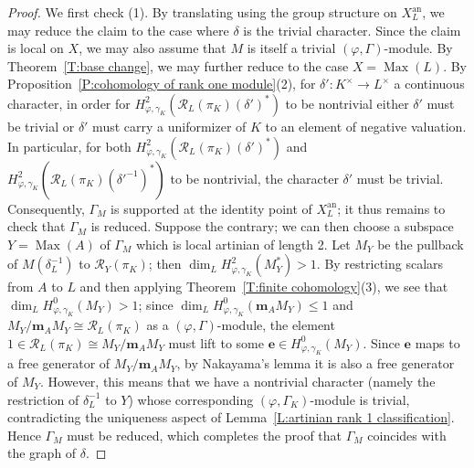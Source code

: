 \documentclass[12pt]{article}
\theoremstyle{definition}
\numberwithin{equation}{theorem}
\newcommand{\calR}{\mathcal{R}}
\newcommand{\bbe}{\mathbf{e}}
\newcommand{\bbm}{\mathbf{m}}
\newcommand{\an}{\mathrm{an}}
\DeclareMathOperator{\Max}{Max}
\begin{document}
\begin{proof}
We first check (1).
By translating using the group structure on $X^{\an}_L$, we may reduce the claim to the case where $\delta$ is the trivial character. Since the claim is local on $X$, we may also assume that $M$ is itself a trivial $(\varphi, \Gamma)$-module. By Theorem~\ref{T:base change}, we may further reduce to the case $X = \Max(L)$.
By Proposition~\ref{P:cohomology of rank one module}(2), for
$\delta': K^\times \to L^\times$ a continuous character, 
in order for
$H^2_{\varphi, \gamma_K}(\calR_L(\pi_K)(\delta')^*)$ to be nontrivial
either $\delta'$ must be trivial or $\delta'$ must carry a uniformizer of $K$ to an element of negative valuation. In particular, for both
$H^2_{\varphi, \gamma_K}(\calR_L(\pi_K)(\delta')^*)$ 
and
$H^2_{\varphi, \gamma_K}(\calR_L(\pi_K)(\left.\delta' \right.^{-1})^*)$ to be nontrivial,
the character $\delta'$ must be trivial.
Consequently, $\Gamma_M$ is supported at the identity point of $X^{\an}_L$; it thus remains to check that $\Gamma_M$ is reduced. Suppose the contrary; we can then choose a subspace $Y = \Max(A)$ of $\Gamma_M$ which is local artinian of length 2.
Let $M_Y$ be the pullback of $M(\delta_L^{-1})$ to $\calR_Y(\pi_K)$;
then $\dim_L H^2_{\varphi,\gamma_K}(M_Y^*) > 1$. By restricting scalars from $A$ to $L$ and then applying Theorem~\ref{T:finite cohomology}(3), we see that $\dim_L H^0_{\varphi,\gamma_K}(M_Y) > 1$; since
$\dim_L H^0_{\varphi,\gamma_K}(\bbm_A M_Y) \leq 1$
and $M_Y / \bbm_A M_Y \cong \calR_L(\pi_K)$ as a $(\varphi, \Gamma)$-module, the element $1 \in \calR_L(\pi_K) \cong M_Y/\bbm_A M_Y$ must lift to some $\bbe \in H^0_{\varphi,\gamma_K}(M_Y)$. Since $\bbe$ maps to a free generator of $M_Y/\bbm_A M_Y$, by Nakayama's lemma it is also a free generator of $M_Y$. However, this means that we have a nontrivial character (namely the restriction of $\delta_L^{-1}$ to $Y$) whose corresponding $(\varphi, \Gamma_K)$-module is trivial, contradicting the uniqueness aspect of Lemma~\ref{L:artinian rank 1 classification}.
Hence $\Gamma_M$ must be reduced, which completes the proof that $\Gamma_M$ coincides with the graph of $\delta$.


\end{proof}
\end{document}
